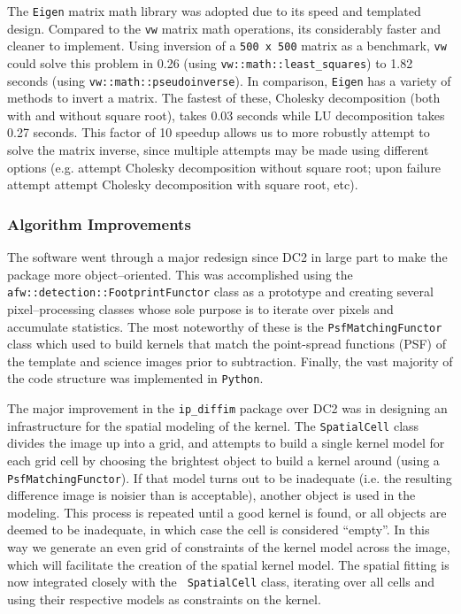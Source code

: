 The {\tt Eigen} matrix math library was adopted due to its speed and
templated design.  Compared to the {\tt vw} matrix math operations,
its considerably faster and cleaner to implement.  Using inversion of
a {\tt 500 x 500} matrix as a benchmark, {\tt vw} could solve this problem
in 0.26 (using {\tt vw::math::least\_squares}) to 1.82 seconds (using
{\tt vw::math::pseudoinverse}).  In comparison, {\tt Eigen} has a
variety of methods to invert a matrix.  The fastest of these, Cholesky
decomposition (both with and without square root), takes 0.03 seconds
while LU decomposition takes 0.27 seconds.  This factor of 10 speedup
allows us to more robustly attempt to solve the matrix inverse, since
multiple attempts may be made using different options (e.g. attempt
Cholesky decomposition without square root; upon failure attempt
attempt Cholesky decomposition with square root, etc).


\subsubsection{Algorithm Improvements} \label{sec:ImsubImprove}

The software went through a major redesign since DC2 in large part to
make the package more object--oriented.  This was accomplished using
the {\tt afw::detection::FootprintFunctor} class as a prototype and
creating several pixel--processing classes whose sole purpose is to
iterate over pixels and accumulate statistics.  The most noteworthy of
these is the {\tt PsfMatchingFunctor} class which used to build
kernels that match the point-spread functions (PSF) of the
template and science images prior to subtraction.  Finally, the vast
majority of the code structure was implemented in {\tt Python}.

The major improvement in the {\tt ip\_diffim} package over DC2 was in
designing an infrastructure for the spatial modeling of the kernel.
The {\tt SpatialCell} class divides the image up into a grid, and
attempts to build a single kernel model for each grid cell by choosing
the brightest object to build a kernel around (using a {\tt
PsfMatchingFunctor}).  If that model turns out to be inadequate
(i.e. the resulting difference image is noisier than is acceptable),
another object is used in the modeling.  This process is repeated
until a good kernel is found, or all objects are deemed to be
inadequate, in which case the cell is considered ``empty''.  In this
way we generate an even grid of constraints of the kernel model across
the image, which will facilitate the creation of the spatial kernel
model.  The spatial fitting is now integrated closely with the {\tt
SpatialCell} class, iterating over all cells and using their
respective models as constraints on the kernel.

